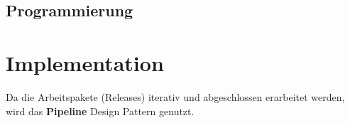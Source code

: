\documentclass[11pt]{article}
\begin{document}
    \subsection{Programmierung}

    \section{Implementation}
    Da die Arbeitspakete (Releases) iterativ und abgeschlossen erarbeitet werden, wird das
    \textbf{Pipeline} Design Pattern\cite{pipeline} genutzt.

    \newpage

    ~\nocite{*}
    \renewcommand{\refname}{Quellen}
    
    
\end{document}
